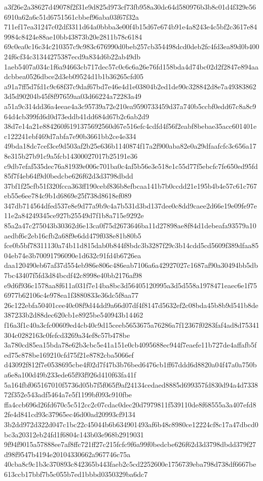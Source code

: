 \documentclass[11pt,a4paper]{article}
\begin{document}
{a3f26e2a38627d49078f2f31e9d825d973cf73fb958a30dc64d580976b3b8c01d4f329e566910a62a6c51d6751561cbbef96aba03f67f32a
711ef17ea31247c02df3311d64a0bbba3e00f4b15d67e674b91e4a8243e4c5bf2c3617e849984c8424e88ae10bb43873b20e2811b78c6184
69c0ea0c16c34c210357c9c983c676990d0beb257cb354498dcd0deb2fc4fd3ea89d0b40024f6cf34c31344275387ecd9a834d6b22ab49db
1aeb5407a034c1f6a94663cb717dec57c0c6c6a26e76fd158bda4d74bc02d2f2847e894aadcbbea0526dbce2d3eb09524d1b1b36265cfd05
a91a7ff5d7fd1c9c68f37c9daf67bd7e46e4d1e03804b2ed1de90c328842d8e7a493838623d5d90204b45f8f97659aa03d66224a72283a49
a51a9c314dd36a4eeae4a3c95739a72e210ea9590733459d37a740b5ccbf0edd67c8a8c964d4cb399fd6d0d73eddb41dd684d67b2c6ab2d9
38d7e14a21e884260f6191375692560d67e516efc4cdfd4f56f2eabf8bebae35acc601401ec122241ebf469d7abfa7e90b3661bb2ce4e334
49bda18dc7cef3ce9d503af2b25e636b1140874f17a2f900aba82e0a29dfaafcfc3c656a178e315b27b91c9a5fcb14300027017b25191e36
c9db7efaf535dec76a81939e006c701ba0c4af5b56e3e518e1c55d77f5ebcfc7fe650ed95fd85f7f4eb64f9d0bedcbe626f62d3d3798dbdd
37bf1f25cfb51f320fcca363ff190cebf836b8efbcaa141b7b0ccdd21e195b4b4e57c61c767eb55e6ee784c9b1d6869e25f738d8618ef089
347db714564dfed537e8e9d77a9b9c4a7b531d3bd137dee0c8dd9caee2d66e19e09fe97e11e2a84249345ce927b25549d7f1b8a715e9292e
85a2a47c275043b30362d6e13ca0f75d2673646ba11d27898ae8f84d1debeafa93579a10aedbf6c2eb16cfb2a68f9e6dd479f038e81b80b5
fce0b5bf78311130a74b11d815dab0b844f8bdc3b3287f29c3b14cdd5cd5609f389dfaa8504eb74e3b70091796090e1d632c91fd4b6726ea
daa120490eb67af37d554eb986e806c486eab7106a6a42927027c1687af90a30494bb5db7bc43407f5fd3d84bcdf42c8998e40bb2176af98
e9d6f936c1578aa8f611a031f7e14ba8bc3d56405120995a3d5d558a1978471eaec6e1f756977b62106c4e978ea1f3880833e36dc5f8aa77
26c122ebfa50401cee40c08f9d44dd9a66d07df4f8147d5632ef2c08bda45b8b9d541b8de387233b2d88dec620cb1e8925be540943b14462
f16a3f1c40a3cfc00609ed4cb40c9d15ceeb5653675a76286a7f12367f0283faf4ad8d75341304c0282163c0fefcd3269a34ef8c57b478be
3a780cd85ea15bda78e62b3cbc5e41a151e0cb4095688ec944f7eaefe11b727de4affafb5fed75c878be169210cfd75f21e8782cba5066ef
d43092f812f7e0538695cbe4f02d7f47b3b76bed6476cb1ff67ddd6d8820a04f47a0a750ba6e8a100d49b233ede65f93f926d410f63fa41f
5a164fbf065167010f5736d05b7f5f065f9af24134cedaed8885d699357fd830d94a4d733872f352e543adf5464a7e5f1199bf093c910fbe
ffa4ccb696d26fd670c5c512cc2c07cdac0dec20d7979811f539110de8f68555a3a407efd82fe4d841cd93c37965ec46d00ad20993cf9134
3b2dd972d322d047c1bc22c45044b6b634901493af6b48c8980ce12224cf8c17a47dbcd0bc3a20312eb24fd1f6804c143b03e968b2919031
9f94f9015a57888ee7af8ffc721ff27c215fcfc9f6a99f0bedcbe626f62d3d3798dbdd379f27d98f9547b4194e20104330662a967746c75a
40cba8c9c1b3c370893c842365b443faeb2c5cd2252600e1756739eba798d738df6667be613ccb17bbf7b5c055b7ed1bbbd0350329ba6dc7
}
\end{document}
